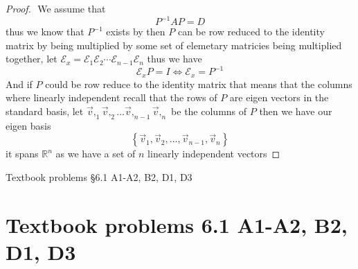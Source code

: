 \documentclass[11pt]{book}
\begin{document}
\begin{proof}
$ $\newline
    We assume that 
    \[
    P^{-1} AP= D
    \]
    thus we know that $P^{-1} $ exists by then $P$ can be row reduced to the identity matrix by being multiplied by some set of elemetary matricies being multiplied together, let $\mathcal{E}_{x} = \mathcal{E} _{1}  \mathcal{E} _{2}  \dotsb   \mathcal{E} _{n - 1}  \mathcal{E} _{n} $ thus we have 
    \[
    \mathcal{E} _{x} P = I \Leftrightarrow \mathcal{E} _{x} = P^{-1} 
    \]
    And if $P$ could be row reduce to the identity matrix that means that the columns where linearly independent recall that the rows of $P$ are eigen vectors in the standard basis, let $\vec{v} ,_{1}  \vec{v} ,_{2}  \dotsc   \vec{v} ,_{n - 1}  \vec{v} ,_{n} $ be the columns of $P$ then we have our eigen basis 
    \[
    \left\{ \vec{v} _{1} , \vec{v} _{2} , \dotsc  , \vec{v} _{n - 1} , \vec{v} _{n}  \right\} 
    \]
    it spans $\mathbb{R} ^{n} $ as we have a set of $n$ linearly independent vectors
\end{proof}

Textbook problems §6.1 A1-A2, B2, D1, D3
\section{Textbook problems 6.1 A1-A2, B2, D1, D3}%
\label{sec:textbook_problems_6_1_a1_a2_b2_d1_d3}
\end{document}
